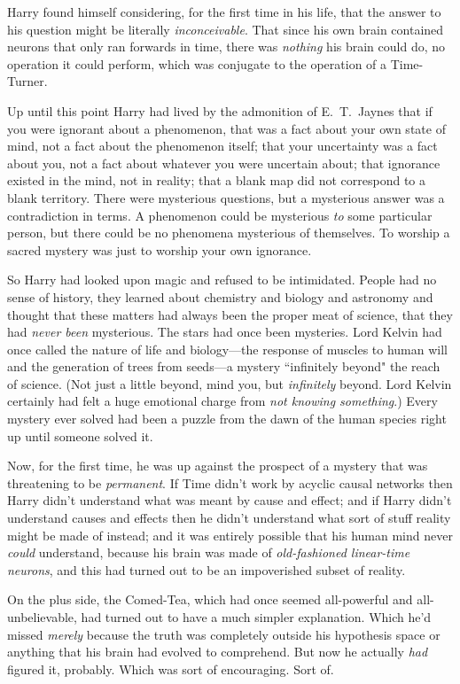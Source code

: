 Harry found himself considering, for the first time in his life, that the answer to his question might be literally \emph{inconceivable}. That since his own brain contained neurons that only ran forwards in time, there was \emph{nothing} his brain could do, no operation it could perform, which was conjugate to the operation of a Time-Turner.

Up until this point Harry had lived by the admonition of E.~T.~Jaynes that if you were ignorant about a phenomenon, that was a fact about your own state of mind, not a fact about the phenomenon itself; that your uncertainty was a fact about you, not a fact about whatever you were uncertain about; that ignorance existed in the mind, not in reality; that a blank map did not correspond to a blank territory. There were mysterious questions, but a mysterious answer was a contradiction in terms. A phenomenon could be mysterious \emph{to} some particular person, but there could be no phenomena mysterious of themselves. To worship a sacred mystery was just to worship your own ignorance.

So Harry had looked upon magic and refused to be intimidated. People had no sense of history, they learned about chemistry and biology and astronomy and thought that these matters had always been the proper meat of science, that they had \emph{never been} mysterious. The stars had once been mysteries. Lord Kelvin had once called the nature of life and biology---the response of muscles to human will and the generation of trees from seeds---a mystery ``infinitely beyond" the reach of science. (Not just a little beyond, mind you, but \emph{infinitely} beyond. Lord Kelvin certainly had felt a huge emotional charge from \emph{not knowing something}.) Every mystery ever solved had been a puzzle from the dawn of the human species right up until someone solved it.

Now, for the first time, he was up against the prospect of a mystery that was threatening to be \emph{permanent}. If Time didn't work by acyclic causal networks then Harry didn't understand what was meant by cause and effect; and if Harry didn't understand causes and effects then he didn't understand what sort of stuff reality might be made of instead; and it was entirely possible that his human mind never \emph{could} understand, because his brain was made of \emph{old-fashioned linear-time neurons}, and this had turned out to be an impoverished subset of reality.

On the plus side, the Comed-Tea, which had once seemed all-powerful and all-unbelievable, had turned out to have a much simpler explanation. Which he'd missed \emph{merely} because the truth was completely outside his hypothesis space or anything that his brain had evolved to comprehend. But now he actually \emph{had} figured it, probably. Which was sort of encouraging. Sort of.

